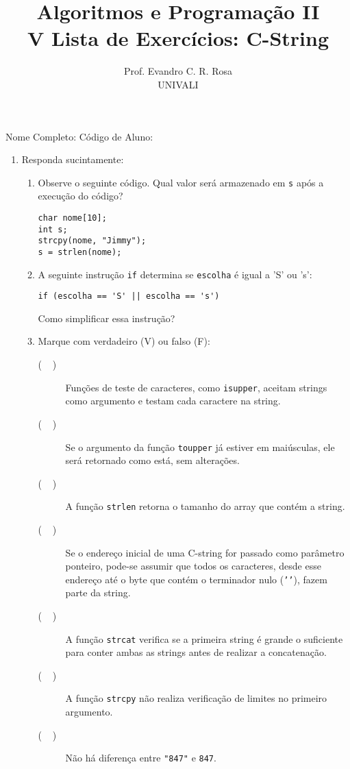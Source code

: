 \documentclass[12pt]{article}
\title{Algoritmos e Programação II\\
\large V Lista de Exercícios: C-String}
\author{Prof. Evandro C. R. Rosa\\UNIVALI}
\date{}
\begin{document}
\maketitle

\noindent Nome Completo: \underline{\hspace{8cm}} Código de Aluno: \underline{\hspace{2.4cm}}

\begin{enumerate}
  \item Responda sucintamente:
    \begin{enumerate}
      \item Observe o seguinte código. Qual valor será armazenado em \texttt{s} após a execução do código?
        \begin{verbatim}
char nome[10];
int s;
strcpy(nome, "Jimmy");
s = strlen(nome);
        \end{verbatim}
      \item A seguinte instrução \texttt{if} determina se \texttt{escolha} é igual a 'S' ou 's':
        \begin{verbatim}
if (escolha == 'S' || escolha == 's')
        \end{verbatim}
        Como simplificar essa instrução?
      \item Marque com verdadeiro (V) ou falso (F):
        \begin{description}
          \item[($\phantom{....}$)] Funções de teste de caracteres, como \texttt{isupper}, aceitam strings como argumento e testam cada caractere na string.
          \item[($\phantom{....}$)] Se o argumento da função \texttt{toupper} já estiver em maiúsculas, ele será retornado como está, sem alterações.
          \item[($\phantom{....}$)] A função \texttt{strlen} retorna o tamanho do array que contém a string.
          \item[($\phantom{....}$)] Se o endereço inicial de uma C-string for passado como parâmetro ponteiro, pode-se assumir que todos os caracteres, desde esse endereço até o byte que contém o terminador nulo (\texttt{'\0'}), fazem parte da string.
          \item[($\phantom{....}$)] A função \texttt{strcat} verifica se a primeira string é grande o suficiente para conter ambas as strings antes de realizar a concatenação.
          \item[($\phantom{....}$)] A função \texttt{strcpy} não realiza verificação de limites no primeiro argumento.
          \item[($\phantom{....}$)] Não há diferença entre \texttt{"847"} e \texttt{847}.
        \end{description}


\end{enumerate}
\end{enumerate}
\end{document}
